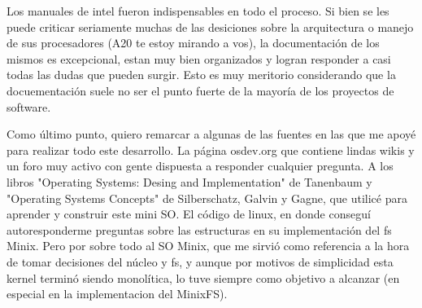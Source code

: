 Los manuales de intel fueron indispensables en todo el proceso. Si bien se les
puede criticar seriamente muchas de las desiciones sobre la arquitectura o
manejo de sus procesadores (A20 te estoy mirando a vos), la documentación de
los mismos es excepcional, estan muy bien organizados y logran responder a casi
todas las dudas que pueden surgir. Esto es muy meritorio considerando que la
docuementación suele no ser el punto fuerte de la mayoría de los proyectos de
software.

Como último punto, quiero remarcar a algunas de las fuentes en las que me apoyé
para realizar todo este desarrollo. La página osdev.org que contiene lindas
wikis y un foro muy activo con gente dispuesta a responder cualquier pregunta.
A los libros "Operating Systems: Desing and Implementation" de Tanenbaum y
"Operating Systems Concepts" de Silberschatz, Galvin y Gagne, que utilicé
para aprender y construir este mini SO. El código de linux, en donde conseguí
autoresponderme preguntas sobre las estructuras en su implementación del fs
Minix. Pero por sobre todo al SO Minix, que me sirvió como referencia a la hora
de tomar decisiones del núcleo y fs, y aunque por motivos de simplicidad esta
kernel terminó siendo monolítica, lo tuve siempre como objetivo a alcanzar (en
especial en la implementacion del MinixFS).
